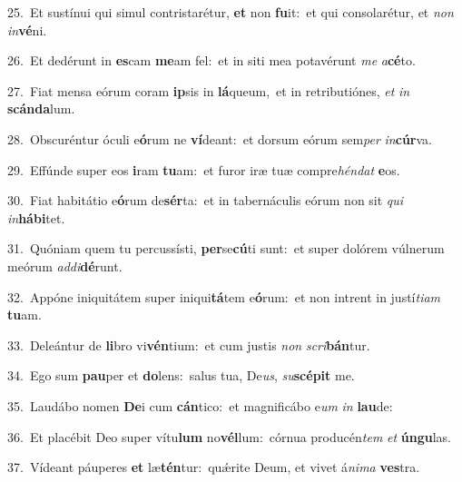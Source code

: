 {\numbfont\textcolor{\numbcolor}{25.}}~Et sustínui qui simul contristarétur, \textbf{et} non \textbf{fu}\-it:~\star et qui consolarétur, et \textit{non} \textit{in}\-\textbf{vé}ni.\par
{\numbfont\textcolor{\numbcolor}{26.}}~Et dedérunt in \textbf{es}\-cam \textbf{me}\-am fel:~\star et in siti mea potavérunt \textit{me} \textit{a}\-\textbf{cé}to.\par
{\numbfont\textcolor{\numbcolor}{27.}}~Fiat mensa eórum coram \textbf{ip}\-sis in \textbf{lá}\-queum,~\star et in retributiónes, \textit{et} \textit{in} \textbf{scán}\-\textbf{da}lum.\par
{\numbfont\textcolor{\numbcolor}{28.}}~Obscuréntur óculi e\-\textbf{ó}\-rum ne \textbf{ví}\-deant:~\star et dorsum eórum sem\textit{per} \textit{in}\-\textbf{cúr}va.\par
{\numbfont\textcolor{\numbcolor}{29.}}~Effúnde super eos \textbf{i}\-ram \textbf{tu}\-am:~\star et furor iræ tuæ compre\-\textit{hén}\-\textit{dat} \textbf{e}\-os.\par
{\numbfont\textcolor{\numbcolor}{30.}}~Fiat habitátio e\-\textbf{ó}\-rum de\-\textbf{sér}\-ta:~\star et in tabernáculis eórum non sit \textit{qui} \textit{in}\-\textbf{há}\textbf{bi}tet.\par
{\numbfont\textcolor{\numbcolor}{31.}}~Quóniam quem tu percussísti, \textbf{per}\-se\-\textbf{cú}\-ti sunt:~\star et super dolórem vúlnerum meórum \textit{ad}\-\textit{di}\textbf{dé}runt.\par
{\numbfont\textcolor{\numbcolor}{32.}}~Appóne iniquitátem super iniqui\-\textbf{tá}\-tem e\-\textbf{ó}\-rum:~\star et non intrent in justí\-\textit{ti}\-\textit{am} \textbf{tu}\-am.\par
{\numbfont\textcolor{\numbcolor}{33.}}~Deleántur de \textbf{li}\-bro vi\-\textbf{vén}\-tium:~\star et cum justis \textit{non} \textit{scri}\-\textbf{bán}tur.\par
{\numbfont\textcolor{\numbcolor}{34.}}~Ego sum \textbf{pau}\-per et \textbf{do}\-lens:~\star salus tua, De\-\textit{us}\-, \textit{su}\-\textbf{scé}\textbf{pit} me.\par
{\numbfont\textcolor{\numbcolor}{35.}}~Laudábo nomen \textbf{De}\-i cum \textbf{cán}\-tico:~\star et magnificábo e\textit{um} \textit{in} \textbf{lau}\-de:\par
{\numbfont\textcolor{\numbcolor}{36.}}~Et placébit Deo super vítu\textbf{lum} no\-\textbf{vél}\-lum:~\star córnua producén\textit{tem} \textit{et} \textbf{ún}\-\textbf{gu}las.\par
{\numbfont\textcolor{\numbcolor}{37.}}~Vídeant páuperes \textbf{et} læ\-\textbf{tén}\-tur:~\star quǽrite Deum, et vivet á\-\textit{ni}\-\textit{ma} \textbf{ves}\-tra.\par
